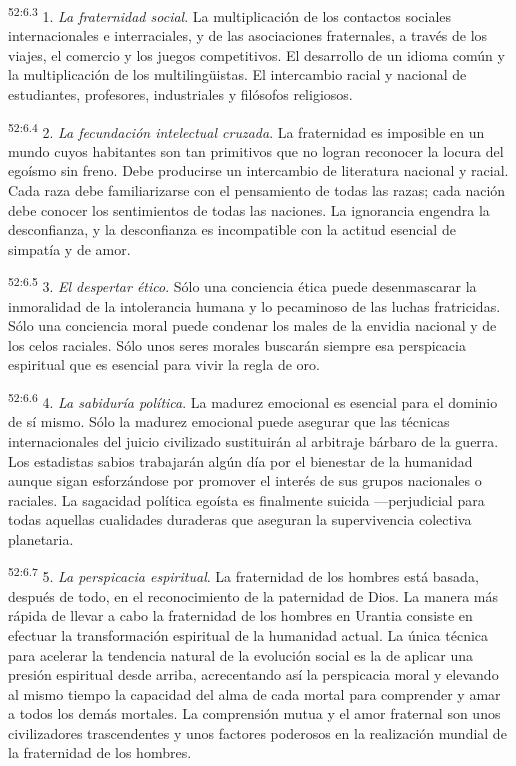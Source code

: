 \par
\textsuperscript{52:6.3} 1. \textit{La fraternidad social}. La multiplicación de los contactos sociales internacionales e interraciales, y de las asociaciones fraternales, a través de los viajes, el comercio y los juegos competitivos. El desarrollo de un idioma común y la multiplicación de los multiling\"uistas. El intercambio racial y nacional de estudiantes, profesores, industriales y filósofos religiosos.

\par
\textsuperscript{52:6.4} 2. \textit{La fecundación intelectual cruzada}. La fraternidad es imposible en un mundo cuyos habitantes son tan primitivos que no logran reconocer la locura del egoísmo sin freno. Debe producirse un intercambio de literatura nacional y racial. Cada raza debe familiarizarse con el pensamiento de todas las razas; cada nación debe conocer los sentimientos de todas las naciones. La ignorancia engendra la desconfianza, y la desconfianza es incompatible con la actitud esencial de simpatía y de amor.

\par
\textsuperscript{52:6.5} 3. \textit{El despertar ético}. Sólo una conciencia ética puede desenmascarar la inmoralidad de la intolerancia humana y lo pecaminoso de las luchas fratricidas. Sólo una conciencia moral puede condenar los males de la envidia nacional y de los celos raciales. Sólo unos seres morales buscarán siempre esa perspicacia espiritual que es esencial para vivir la regla de oro.

\par
\textsuperscript{52:6.6} 4. \textit{La sabiduría política}. La madurez emocional es esencial para el dominio de sí mismo. Sólo la madurez emocional puede asegurar que las técnicas internacionales del juicio civilizado sustituirán al arbitraje bárbaro de la guerra. Los estadistas sabios trabajarán algún día por el bienestar de la humanidad aunque sigan esforzándose por promover el interés de sus grupos nacionales o raciales. La sagacidad política egoísta es finalmente suicida ---perjudicial para todas aquellas cualidades duraderas que aseguran la supervivencia colectiva planetaria.

\par
\textsuperscript{52:6.7} 5. \textit{La perspicacia espiritual}. La fraternidad de los hombres está basada, después de todo, en el reconocimiento de la paternidad de Dios. La manera más rápida de llevar a cabo la fraternidad de los hombres en Urantia consiste en efectuar la transformación espiritual de la humanidad actual. La única técnica para acelerar la tendencia natural de la evolución social es la de aplicar una presión espiritual desde arriba, acrecentando así la perspicacia moral y elevando al mismo tiempo la capacidad del alma de cada mortal para comprender y amar a todos los demás mortales. La comprensión mutua y el amor fraternal son unos civilizadores trascendentes y unos factores poderosos en la realización mundial de la fraternidad de los hombres.


